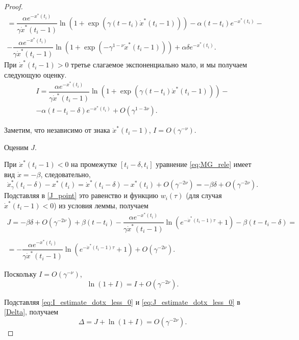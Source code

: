 \begin{proof}
\begin{multline}
	= \dfrac{\alpha e^{-x^*(t_i)}}{\gamma \dot{x}^*(t_i - 1)}\ln\left(1 + \exp(\gamma(t - t_i)\dot{x}^*(t_i - 1))\right) - \alpha (t - t_i) e^{-x^*(t_i)} -\\- \dfrac{\alpha e^{-x^*(t_i)}}{\gamma \dot{x}^*(t_i - 1)}\ln\left(1 + \exp(-\gamma^{1 - \nu}\dot{x}^*(t_i - 1))\right) + \alpha \delta e^{-x^*(t_i)}. 
	\end{multline}
	При $\dot{x}^*(t_i - 1) > 0$ третье слагаемое экспоненциально мало, и мы получаем следующую оценку.
	\begin{multline}
		\label{eq:I_estimate_dotx_greater_0}
		I = \dfrac{\alpha e^{-x^*(t_i)}}{\gamma \dot{x}^*(t_i - 1)}\ln\left(1 + \exp(\gamma(t - t_i)\dot{x}^*(t_i - 1))\right) -\\- \alpha (t - t_i - \delta) e^{-x^*(t_i)} + O(\gamma^{1 - 3\nu}).
	\end{multline}
	
	Заметим, что независимо от знака $\dot{x}^*(t_i - 1)$, $I = O(\gamma^{-\nu})$.
	
	Оценим $J$.
	
	При $\dot{x}^*(t_i - 1) < 0$ на промежутке $[t_i - \delta, t_i]$ уравнение \eqref{eq:MG_rele} имеет вид $\dot{x} = -\beta$, следовательно, 
	\[
	\dot{x}_{\gamma}^*(t_i - \delta) - x^*(t_i) = \dot{x}^*(t_i - \delta) - x^*(t_i) + O(\gamma^{-2\nu}) = -\beta \delta + O(\gamma^{-2\nu}).
	\]
	Подставляя в \eqref{J_point} это равенство и функцию $w_i(\tau)$ (для случая $\dot{x}^*(t_i - 1) < 0$) из условия леммы, получаем
	\begin{multline}
		\label{eq:J_estimate_dotx_less_0}
	J = -\beta \delta + O(\gamma^{-2\nu}) + \beta (t - t_i) - \dfrac{\alpha e^{-x^*(t_i)}}{\gamma \dot{x}^*(t_i - 1)} \ln\left(e^{-\dot{x}^*(t_i - 1)\tau} + 1\right) - \beta(t - t_i - \delta) =\\
	\\= -\dfrac{\alpha e^{-x^*(t_i)}}{\gamma \dot{x}^*(t_i - 1)} \ln\left(e^{-\dot{x}^*(t_i - 1)\tau} + 1\right) + O(\gamma^{-2\nu}).
	\end{multline}
	
	Поскольку $I = O(\gamma^{-\nu})$, 
	\begin{equation}
	\label{eq:ln_1_plus_I}
	\ln(1 + I) = I + O(\gamma^{-2\nu}).
	\end{equation}
	
	Подставляя \eqref{eq:I_estimate_dotx_less_0} и \eqref{eq:J_estimate_dotx_less_0} в \eqref{Delta}, получаем
	\[
	\Delta = J + \ln(1 + I) = O(\gamma^{-2\nu}).
	\]
	

\end{proof}
